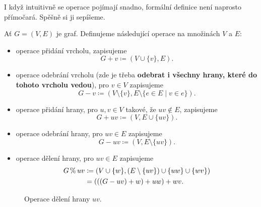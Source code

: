 I když intuitivně se operace pojímají snadno, formální definice není naprosto
přímočará. Spěšně si ji sepíšeme.

\begin{definition}
 \label{def:zakladni-grafove-operace}
 Ať $G = (V,E)$ je graf. Definujeme následující operace na množinách $V$ a $E$:
 \begin{itemize}
  \item operace přidání vrcholu, zapisujeme
   \[
    G + v \coloneqq (V \cup \{v\}, E).
   \]
  \item operace odebrání vrcholu (zde je třeba \textbf{odebrat i všechny hrany,
   které do tohoto vrcholu vedou}), pro $v \in V$ zapisujeme
   \[
    G - v \coloneqq (V \setminus \{v\}, E \setminus \{e \in E \mid v \in e\}).
   \]
  \item operace přidání hrany, pro $u,v \in V$ takové, že $uv \notin E$,
   zapisujeme
   \[
    G + uv \coloneqq (V, E \cup \{uv\}).
   \]
  \item operace odebrání hrany, pro $uv \in E$ zapisujeme
   \[
    G - uv \coloneqq (V, E \setminus \{uv\}).
   \]
  \item operace dělení hrany, pro $uv \in E$ zapisujeme
   \begin{equation*}
    \begin{split} 
     G \operatorname{\%} uv &\coloneqq (V \cup \{w\}, (E \setminus \{uv\}) \cup \{uw\} \cup
     \{wv\})\\
              &= (((G - uv) + w) + uw) + wv.
    \end{split}
   \end{equation*}
 \end{itemize}
\end{definition}

\begin{figure}[h]
 \centering

 \caption{Operace dělení hrany $uv$.}
 \label{fig:deleni-hrany}
\end{figure}

